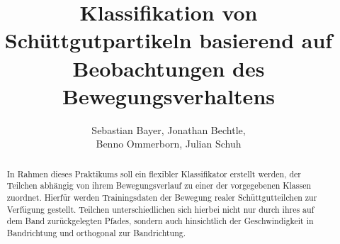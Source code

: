 \documentclass[cover]{isas-seminar}
\title{Klassifikation von Schüttgutpartikeln basierend auf Beobachtungen des Bewegungsverhaltens}
\author{Sebastian Bayer, Jonathan Bechtle,\\ Benno Ommerborn, Julian Schuh}
\begin{document}
\maketitle

\begin{abstract}
In Rahmen dieses Praktikums soll ein flexibler Klassifikator erstellt werden, der Teilchen abhängig von ihrem Bewegungsverlauf zu einer der vorgegebenen Klassen zuordnet. Hierfür werden Trainingsdaten der Bewegung realer Schüttgutteilchen zur Verfügung gestellt. Teilchen unterschiedlichen sich hierbei nicht nur durch ihres auf dem Band zurückgelegten Pfades, sondern auch hinsichtlich der Geschwindigkeit in Bandrichtung und orthogonal zur Bandrichtung.
\end{abstract}
\clearpage
\tableofcontents
\cleardoublepage



\clearpage

\clearpage







\end{document}
